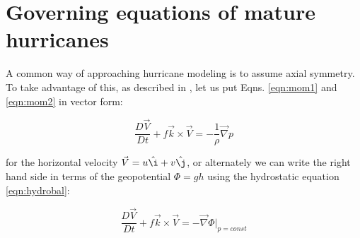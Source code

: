 \section{Governing equations of mature hurricanes}

A common way of approaching hurricane modeling is to assume axial symmetry. To take advantage of this, as described in \cite{holton_hakim_2019}, let us put Eqns. \ref{eqn:mom1} and \ref{eqn:mom2} in vector form:

\begin{equation}
    \frac{D\vec{V}}{Dt}+f\vec{k}\times\vec{V}=-\frac{1}{\rho}\vec{\nabla}p
\end{equation}

for the horizontal velocity $\vec{V}=u\hat{\i}+v\hat{\j}$, or alternately we can write the right hand side in terms of the geopotential $\Phi=gh$ using the hydrostatic equation \ref{eqn:hydrobal}:

\begin{equation}
    \frac{D\vec{V}}{Dt}+f\vec{k}\times\vec{V}=-\vec{\nabla}\Phi|_{p=const}
    \label{eqn:momvec}
\end{equation}



